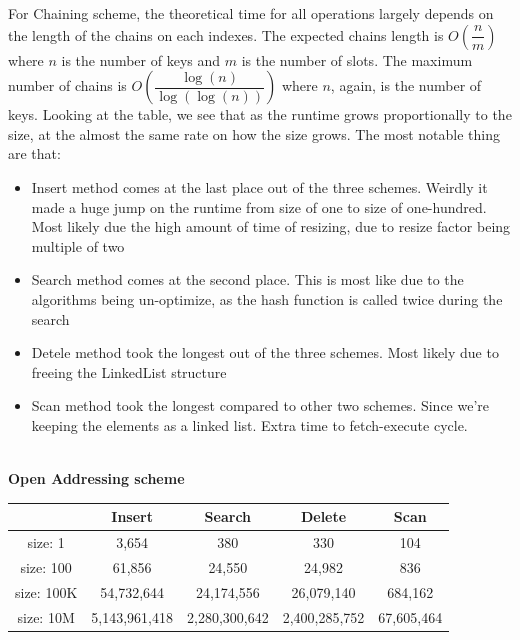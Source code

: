 \documentclass{article} %
\begin{document}
    For Chaining scheme, the theoretical time for all operations largely depends on the length of the chains on each indexes.
    The expected chains length is $O\left(\dfrac{n}{m}\right)$ where $n$ is the number of keys and $m$ is the number of slots.
    The maximum number of chains is $O\left(\dfrac{\log(n)}{\log(\log(n))}\right)$ where $n$, again, is the number of keys.
    Looking at the table, we see that as the runtime grows proportionally to the size, at the almost the same rate on how the size grows.
    The most notable thing are that:
    \begin{itemize}
        \item Insert method comes at the last place out of the three schemes.
        Weirdly it made a huge jump on the runtime from size of one to size of one-hundred.
        Most likely due the high amount of time of resizing, due to resize factor being multiple of two
        \item Search method comes at the second place.
        This is most like due to the algorithms being un-optimize, as the hash function is called twice during the search
        \item Detele method took the longest out of the three schemes.
        Most likely due to freeing the LinkedList structure
        \item Scan method took the longest compared to other two schemes.
        Since we're keeping the elements as a linked list.
        Extra time to fetch-execute cycle.
    \end{itemize}
    \\

    \textbf{Open Addressing scheme}
    \begin{center}
        \begin{tabular}{|c|c|c|c|c|}\hline
        & Insert & Search & Delete & Scan\\\hline
        size: 1 & 3,654 & 380 & 330 & 104\\\hline
        size: 100 & 61,856 & 24,550 & 24,982 & 836\\\hline
        size: 100K & 54,732,644 & 24,174,556 & 26,079,140 & 684,162\\\hline
        size: 10M & 5,143,961,418 & 2,280,300,642 & 2,400,285,752 & 67,605,464\\\hline
        \end{tabular}
    \end{center}
\end{document}
